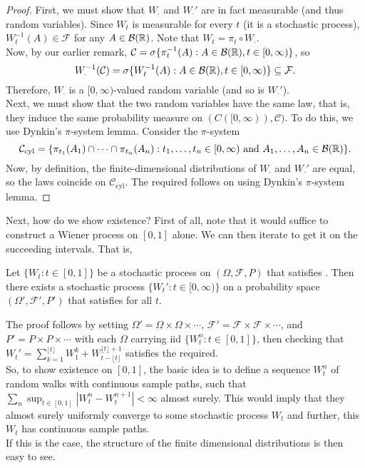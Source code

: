 \begin{proof}
	First, we must show that $W_{\cdot}$ and $W_{\cdot}'$ are in fact measurable (and thus random variables). Since $W_t$ is measurable for every $t$ (it is a stochastic process), $W_t^{-1}(A)\in\mathcal{F}$ for any $A\in\mathcal{B}(\mathbb{R})$. Note that $W_t = \pi_t\circ W_\cdot$.\\
	Now, by our earlier remark, $\mathcal{C} = \sigma\{\pi_t^{-1}(A) : A\in\mathcal{B}(\mathbb{R}), t\in[0,\infty)\}$, so
	\[ W_{\cdot}^{-1}(\mathcal{C}) = \sigma\{W_t^{-1}(A) : A\in\mathcal{B}(\mathbb{R}), t\in[0,\infty)\}\subseteq \mathcal{F}. \]
	Therefore, $W_{\cdot}$ is a $[0,\infty)$-valued random variable (and so is $W_{\cdot}'$).\\

	Next, we must show that the two random variables have the same law, that is, they induce the same probability measure on $(C([0,\infty)),\mathcal{C})$. To do this, we use Dynkin's $\pi$-system lemma. Consider the $\pi$-system
	\[ \mathcal{C}_{\text{cyl}} = \{ \pi_{t_1}(A_1)\cap\cdots\cap\pi_{t_n}(A_n) : t_1,\ldots,t_n\in[0,\infty) \text{ and } A_1,\ldots,A_n\in\mathcal{B}(\mathbb{R}) \}. \]
	Now, by definition, the finite-dimensional distributions of $W_{\cdot}$ and $W_{\cdot}'$ are equal, so the laws coincide on $\mathcal{C}_\text{cyl}$. The required follows on using Dynkin's $\pi$-system lemma.
\end{proof}

Next, how do we show existence? First of all, note that it would suffice to construct a Wiener process on $[0,1]$ alone. We can then iterate to get it on the succeeding intervals. That is,
\begin{lemma}
	Let $\{W_t : t\in[0,1]\}$ be a stochastic process on $(\Omega,\mathcal{F},P)$ that satisfies . Then there exists a stochastic process $\{W_t' : t\in[0,\infty)\}$ on a probability space $(\Omega',\mathcal{F}',P')$ that satisfies  for all $t$.
\end{lemma}

The proof follows by setting $\Omega'=\Omega\times\Omega\times\cdots$, $\mathcal{F}'=\mathcal{F}\times\mathcal{F}\times\cdots$, and $P'=P\times P\times\cdots$ with each $\Omega$ carrying iid $\{W_t^n : t\in[0,1] \}$, then checking that $W_t' = \sum_{k=1}^{\lfloor t\rfloor} W_1^k + W_{t-\lfloor t\rfloor}^{\lfloor t\rfloor+1}$ satisfies the required.\\

So, to show existence on $[0,1]$, the basic idea is to define a sequence $W_t^n$ of random walks with continuous sample paths, such that $\sum_n \sup_{t\in[0,1]} |W_t^n - W_t^{n+1}| < \infty$ almost surely. This would imply that they almost surely uniformly converge to some stochastic process $W_t$ and further, this $W_t$ has continuous sample paths.\\
If this is the case, the structure of the finite dimensional distributions is then easy to see.\\

